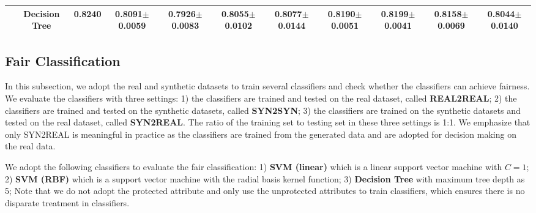 \documentclass[sigconf]{acmart}
\theoremstyle{definition}
\begin{document}
\begin{table}[h]
{\begin{tabular}{|l|c|c|c|c|c|c|c|c|c|c|}
                                                                           & Decision Tree               & 0.8240    & 0.8091$\pm$0.0059                                              & 0.7926$\pm$0.0083                                                    & 0.8055$\pm$0.0102                                                    & 0.8077$\pm$0.0144                                                  & 0.8190$\pm$0.0051                                              & 0.8199$\pm$0.0041                                                    & 0.8158$\pm$0.0069                                                    & 0.8044$\pm$0.0140                                                  \\ \hline
\end{tabular}
}
\end{table}

\subsection{Fair Classification}
In this subsection, we adopt the real and synthetic datasets to train several classifiers and check whether the classifiers can achieve fairness. We evaluate the classifiers with three settings: 1) the classifiers are trained and tested on the real dataset, called \textbf{REAL2REAL}; 2) the classifiers are trained and tested on the synthetic datasets, called \textbf{SYN2SYN}; 3) the classifiers are trained on the synthetic datasets and tested on the real dataset, called \textbf{SYN2REAL}. The ratio of the training set to testing set in these three settings is 1:1. We emphasize that only SYN2REAL is meaningful in practice as the classifiers are trained from the generated data and are adopted for decision making on the real data. 

We adopt the following classifiers to evaluate the fair classification: 1) \textbf{SVM (linear)} which is a linear support vector machine with $C=1$; 2) \textbf{SVM (RBF)} which is a support vector machine with the radial basis kernel function; 3) \textbf{Decision Tree} with maximum tree depth as 5; Note that we do not adopt the protected attribute and only use the unprotected attributes to train classifiers, which ensures there is no disparate treatment in classifiers. 
\end{document}
